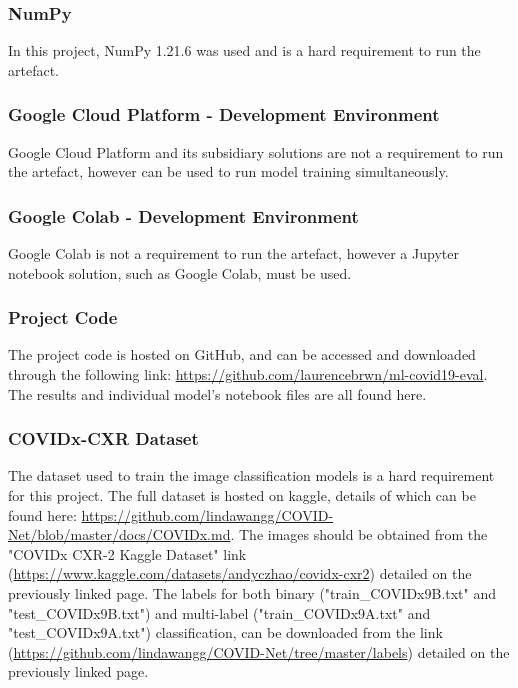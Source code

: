 \subsubsection{NumPy}
In this project, NumPy 1.21.6 was used and is a hard requirement to run the artefact.

\subsubsection{Google Cloud Platform - Development Environment}
Google Cloud Platform and its subsidiary solutions are not a requirement to run the artefact, however can be used to run model training simultaneously.

\subsubsection{Google Colab - Development Environment}
Google Colab is not a requirement to run the artefact, however a Jupyter notebook solution, such as Google Colab, must be used.

\subsubsection{Project Code}
The project code is hosted on GitHub, and can be accessed and downloaded through the following link: \url{https://github.com/laurencebrwn/ml-covid19-eval}. The results and individual model's notebook files are all found here.

\subsubsection{COVIDx-CXR Dataset}
The dataset used to train the image classification models is a hard requirement for this project. The full dataset is hosted on kaggle, details of which can be found here: \url{https://github.com/lindawangg/COVID-Net/blob/master/docs/COVIDx.md}. The images should be obtained from the "COVIDx CXR-2 Kaggle Dataset" link (\url{https://www.kaggle.com/datasets/andyczhao/covidx-cxr2}) detailed on the previously linked page. The labels for both binary ("train\_COVIDx9B.txt" and "test\_COVIDx9B.txt") and multi-label ("train\_COVIDx9A.txt" and "test\_COVIDx9A.txt") classification, can be downloaded from the link (\url{https://github.com/lindawangg/COVID-Net/tree/master/labels}) detailed on the previously linked page.


